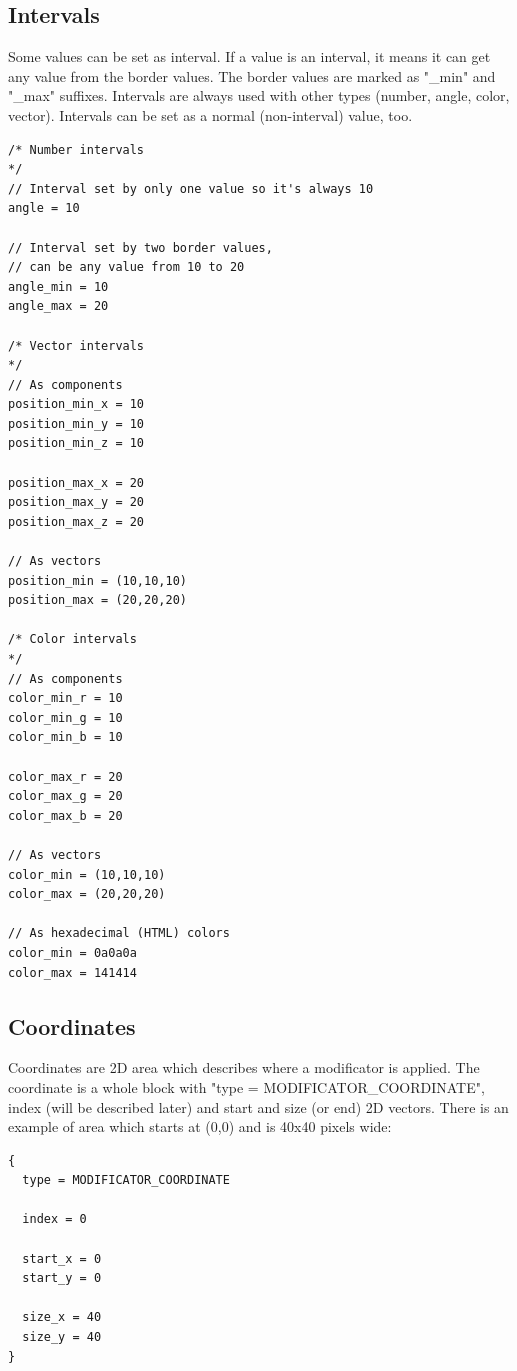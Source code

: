 \documentclass[9pt]{article}
\begin{document}
\subsection{Intervals}
Some values can be set as interval. If a value is an interval,
it means it can get any value from the border values. The border values
are marked as "\_min" and "\_max" suffixes. Intervals are always used
with other types (number, angle, color, vector). Intervals can be set 
as a normal (non-interval) value, too.
\begin{verbatim}
/* Number intervals
*/
// Interval set by only one value so it's always 10
angle = 10

// Interval set by two border values, 
// can be any value from 10 to 20
angle_min = 10
angle_max = 20 

/* Vector intervals
*/ 
// As components
position_min_x = 10
position_min_y = 10
position_min_z = 10

position_max_x = 20
position_max_y = 20
position_max_z = 20

// As vectors
position_min = (10,10,10)
position_max = (20,20,20)

/* Color intervals
*/
// As components
color_min_r = 10
color_min_g = 10
color_min_b = 10

color_max_r = 20
color_max_g = 20
color_max_b = 20

// As vectors
color_min = (10,10,10)
color_max = (20,20,20)

// As hexadecimal (HTML) colors
color_min = 0a0a0a
color_max = 141414 
\end{verbatim}

\subsection{Coordinates}
Coordinates are 2D area which describes 
where a modificator is applied. The coordinate is a whole 
block with "type = MODIFICATOR\_COORDINATE", index (will be described later)
and start and size (or end) 2D vectors. There is an example of area
which starts at (0,0) and is 40x40 pixels wide:
\begin{verbatim}
{
  type = MODIFICATOR_COORDINATE

  index = 0

  start_x = 0
  start_y = 0

  size_x = 40
  size_y = 40
}
\end{verbatim}
\end{document}
